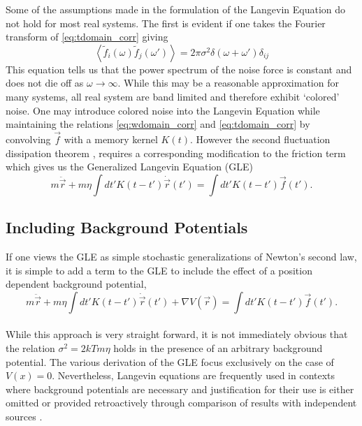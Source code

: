 Some of the assumptions made in the formulation of the Langevin Equation do not hold for most real systems. The first is evident if one takes the Fourier transform of \ref{eq:tdomain_corr} giving
\begin{equation}
\left<\tilde{f}_i(\omega)\tilde{f}_j(\omega')\right>=2\pi\sigma^2\delta(\omega+\omega')\delta_{ij} \label{eq:wdomain_corr}
\end{equation}
This equation tells us that the power spectrum of the noise force is constant and does not die off as $\omega \rightarrow \infty$. While this may be a reasonable approximation for many systems, all real system are band limited and therefore exhibit `colored' noise. One may introduce colored noise into the Langevin Equation while maintaining the relations \ref{eq:wdomain_corr} and \ref{eq:tdomain_corr} by convolving $\vec{f}$ with a memory kernel $K(t)$. However the second fluctuation dissipation theorem \cite{Kubo}, requires a corresponding modification to the friction term which gives us the Generalized Langevin Equation (GLE)
\begin{equation}
m\ddot{\vec{r}} + m \eta \int dt' K\left(t-t'\right) \dot{\vec{r}}(t') = \int dt' K\left(t-t'\right) \vec{f}(t').
\end{equation}

\subsection{Including Background Potentials} \label{sec:gle_with_background}

If one views the GLE as simple stochastic generalizations of Newton's second law, it is simple to add a term to the GLE to include the effect of a position dependent background potential,
\begin{equation}
m\ddot{\vec{r}} + m \eta \int dt' K\left(t-t'\right) \dot{\vec{r}}(t') + \nabla V\left(\vec{r}\right)= \int dt' K\left(t-t'\right) \vec{f}(t').
\end{equation}
\\
While this approach is very straight forward, it is not immediately obvious that the relation $\sigma^2 = 2kTm\eta$ holds in the presence of an arbitrary background potential. The various derivation of the GLE \cite{Kubo, Pathria, Tong} focus exclusively on the case of $V(x)=0$. Nevertheless, Langevin equations are frequently used in contexts where background potentials are necessary and justification for their use is either omitted or provided retroactively through comparison of results with independent sources \cite{Ward, Townsend, AVIDOR2019145}.  

